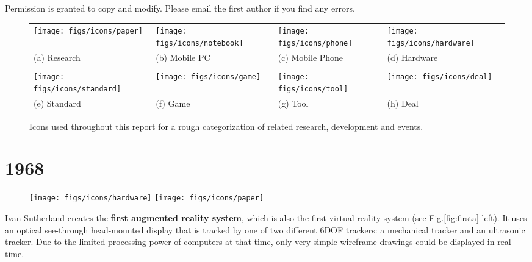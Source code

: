 \documentclass[12pt,a4paper]{article}
\begin{document}
Permission is granted to copy and modify. Please email the first author if you find any errors.

\vspace{20pt}

\begin{figure}[htbp]
\centering
\begin{tabular}{p{90pt}p{90pt}p{90pt}p{90pt}}
\texttt{[image: figs/icons/paper]} &
\texttt{[image: figs/icons/notebook]} &
\texttt{[image: figs/icons/phone]} &
\texttt{[image: figs/icons/hardware]} \\
\small (a) Research & \small (b) Mobile PC & \small (c) Mobile Phone & \small (d) Hardware \\
\vspace{0.1in} \\
\texttt{[image: figs/icons/standard]} &
\texttt{[image: figs/icons/game]} &
\texttt{[image: figs/icons/tool]} &
\texttt{[image: figs/icons/deal]} \\
\small (e) Standard & \small (f) Game & \small (g) Tool & (h) Deal
\end{tabular}
\caption{Icons used throughout this report for a rough categorization of related research, development and events.} \label{fig:zero}
\vspace{-20pt}
\end{figure}

\newpage

\section*{1968}
\begin{wrapfigure}{l}{2.1cm}
	\vspace{-10pt}	
	\texttt{[image: figs/icons/hardware]}
	\texttt{[image: figs/icons/paper]}
	\vspace{-20pt}		
\end{wrapfigure}
Ivan Sutherland \cite{Sutherland1968} creates the \textbf{first augmented reality system}, which is also the first virtual reality system (see Fig.\ref{fig:firsta} left). It uses an optical see-through head-mounted display that is tracked by one of two different 6DOF trackers: a mechanical tracker and an ultrasonic tracker. Due to the limited processing power of computers at that time, only very simple wireframe drawings could be displayed in real time.
\end{document}
